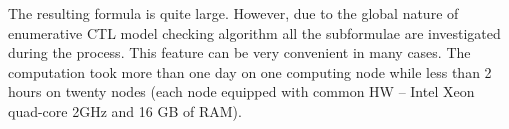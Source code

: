 \documentclass{llncs}
\begin{document}
The resulting formula is quite large. However, due to the global nature of enumerative CTL model checking algorithm all the subformulae are investigated during the process. %
This feature can be very convenient in many cases. The computation took 
more than one day on one computing node while  
less than 2 hours on twenty nodes (each node equipped with common HW -- Intel Xeon quad-core 2GHz and 16 GB of RAM).


\end{document}
